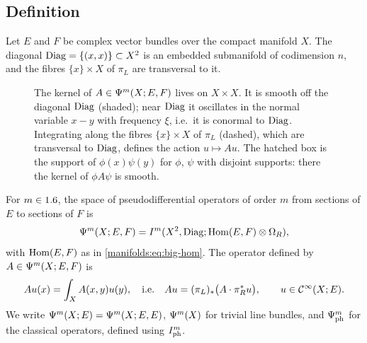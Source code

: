 \subsection{Definition}
Let $E$ and $F$ be complex vector bundles over the compact manifold $X$. The
diagonal $\operatorname{Diag}=\{(x,x)\}\subset X^2$ is an embedded submanifold of codimension
$n$, and the fibres $\{x\}\times X$ of $\pi_L$ are transversal to it.

\begin{figure}[ht]
\centering
{}
\caption{The kernel of $A\in\Psi^{m}(X;E,F)$ lives on $X\times X$. It is
smooth off the diagonal $\operatorname{Diag}$ (shaded); near $\operatorname{Diag}$ it oscillates in the
normal variable $x-y$ with frequency $\xi$, i.e.\ it is conormal to
$\operatorname{Diag}$. Integrating along the fibres $\{x\}\times X$ of $\pi_L$ (dashed),
which are transversal to $\operatorname{Diag}$, defines the action $u\mapsto Au$. The hatched
box is the support of $\phi(x)\psi(y)$ for $\phi$, $\psi$ with disjoint
supports: there the kernel of $\phi A\psi$ is smooth.}
\label{manifolds:fig:kernel}
\end{figure}

\begin{definition}\label{manifolds:def:psido}
For $m\in1.6$, the space of pseudodifferential operators of order $m$ from
sections of $E$ to sections of $F$ is
\begin{equation}\label{manifolds:eq:def-psido}
\Psi^{m}(X;E,F)=I^{m}(X^2,\operatorname{Diag};\operatorname{Hom}(E,F)\otimes\Omega_R),
\end{equation}
with $\operatorname{Hom}(E,F)$ as in \eqref{manifolds:eq:big-hom}. The operator defined by
$A\in\Psi^{m}(X;E,F)$ is
\begin{equation}\label{manifolds:eq:action}
Au(x)=\int_XA(x,y)u(y),\quad\text{i.e.}\quad
Au=(\pi_L)_*\big(A\cdot\pi_R^*u\big),\qquad u\in\mathcal{C}^\infty(X;E).
\end{equation}
We write $\Psi^{m}(X;E)=\Psi^{m}(X;E,E)$, $\Psi^{m}(X)$ for trivial line bundles,
and $\Psi^{m}_{\mathrm{ph}}$ for the classical operators, defined using
$I^{m}_{\mathrm{ph}}$.
\end{definition}

